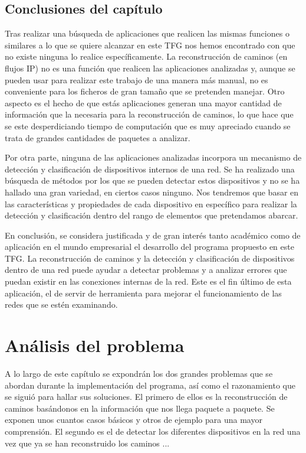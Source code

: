 \documentclass[twoside, 12pt]{epstfg}
\begin{document}
\section{Conclusiones del capítulo}
Tras realizar una búsqueda de aplicaciones que realicen las mismas funciones o similares a lo que se quiere alcanzar en este TFG nos hemos encontrado con que no existe ninguna lo realice específicamente. La reconstrucción de caminos (en flujos IP) no es una función que realicen las aplicaciones analizadas y, aunque se pueden usar para realizar este trabajo de una manera más manual, no es conveniente para los ficheros de gran tamaño que se pretenden manejar. Otro aspecto es el hecho de que estás aplicaciones generan una mayor cantidad de información que la necesaria para la reconstrucción de caminos, lo que hace que se este desperdiciando tiempo de computación que es muy apreciado cuando se trata de grandes cantidades de paquetes a analizar.

Por otra parte, ninguna de las aplicaciones analizadas incorpora un mecanismo de detección y clasificación de dispositivos internos de una red. Se ha realizado una búsqueda de métodos por los que se pueden detectar estos dispositivos y no se ha hallado una gran variedad, en ciertos casos ninguno. Nos tendremos que basar en las características y propiedades de cada dispositivo en específico para realizar la detección y clasificación dentro del rango de elementos que pretendamos abarcar.

En conclusión, se considera justificada y de gran interés tanto académico como de aplicación en el mundo empresarial el desarrollo del programa propuesto en este TFG. La reconstrucción de caminos y la detección y clasificación de dispositivos dentro de una red puede ayudar a detectar problemas y a analizar errores que puedan existir en las conexiones internas de la red. Este es el fin último de esta aplicación, el de servir de herramienta para mejorar el funcionamiento de las redes que se estén examinando.


\chapter{Análisis del problema}
\label{chap:Analisis}
A lo largo de este capítulo se expondrán los dos grandes problemas que se abordan durante la implementación del programa, así como el razonamiento que se siguió para hallar sus soluciones. El primero de ellos es la reconstrucción de caminos basándonos en la información que nos llega paquete a paquete. Se exponen unos cuantos casos básicos y otros de ejemplo para una mayor comprensión. El segundo es el de detectar los diferentes dispositivos en la red una vez que ya se han reconstruido los caminos ...
\end{document}
